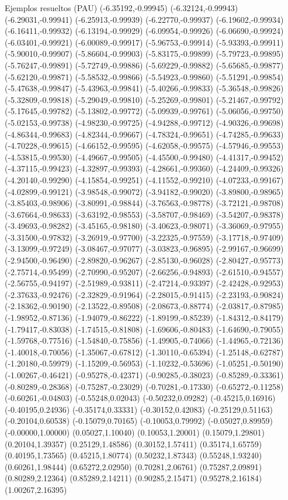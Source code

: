 \documentclass[11pt,a4paper]{article}
\begin{document}
\begin{fmex}{Ejemplos resueltos (PAU)}
(-6.35192,-0.99945) (-6.32124,-0.99943) (-6.29031,-0.99941) (-6.25913,-0.99939) (-6.22770,-0.99937) (-6.19602,-0.99934) (-6.16411,-0.99932) (-6.13194,-0.99929) (-6.09954,-0.99926) (-6.06690,-0.99924) (-6.03401,-0.99921) (-6.00089,-0.99917) (-5.96753,-0.99914) (-5.93393,-0.99911) (-5.90010,-0.99907) (-5.86604,-0.99903) (-5.83175,-0.99899) (-5.79723,-0.99895) (-5.76247,-0.99891) (-5.72749,-0.99886) (-5.69229,-0.99882) (-5.65685,-0.99877) (-5.62120,-0.99871) (-5.58532,-0.99866) (-5.54923,-0.99860) (-5.51291,-0.99854) (-5.47638,-0.99847) (-5.43963,-0.99841) (-5.40266,-0.99833) (-5.36548,-0.99826) (-5.32809,-0.99818) (-5.29049,-0.99810) (-5.25269,-0.99801) (-5.21467,-0.99792) (-5.17645,-0.99782) (-5.13802,-0.99772) (-5.09939,-0.99761) (-5.06056,-0.99750) (-5.02153,-0.99738) (-4.98230,-0.99725) (-4.94288,-0.99712) (-4.90326,-0.99698) (-4.86344,-0.99683) (-4.82344,-0.99667) (-4.78324,-0.99651) (-4.74285,-0.99633) (-4.70228,-0.99615) (-4.66152,-0.99595) (-4.62058,-0.99575) (-4.57946,-0.99553) (-4.53815,-0.99530) (-4.49667,-0.99505) (-4.45500,-0.99480) (-4.41317,-0.99452) (-4.37115,-0.99423) (-4.32897,-0.99393) (-4.28661,-0.99360) (-4.24409,-0.99326) (-4.20140,-0.99290) (-4.15854,-0.99251) (-4.11552,-0.99210) (-4.07233,-0.99167) (-4.02899,-0.99121) (-3.98548,-0.99072) (-3.94182,-0.99020) (-3.89800,-0.98965) (-3.85403,-0.98906) (-3.80991,-0.98844) (-3.76563,-0.98778) (-3.72121,-0.98708) (-3.67664,-0.98633) (-3.63192,-0.98553) (-3.58707,-0.98469) (-3.54207,-0.98378) (-3.49693,-0.98282) (-3.45165,-0.98180) (-3.40623,-0.98071) (-3.36069,-0.97955) (-3.31500,-0.97832) (-3.26919,-0.97700) (-3.22325,-0.97559) (-3.17718,-0.97409) (-3.13099,-0.97249) (-3.08467,-0.97077) (-3.03823,-0.96895) (-2.99167,-0.96699) (-2.94500,-0.96490) (-2.89820,-0.96267) (-2.85130,-0.96028) (-2.80427,-0.95773) (-2.75714,-0.95499) (-2.70990,-0.95207) (-2.66256,-0.94893) (-2.61510,-0.94557) (-2.56755,-0.94197) (-2.51989,-0.93811) (-2.47214,-0.93397) (-2.42428,-0.92953) (-2.37633,-0.92476) (-2.32829,-0.91964) (-2.28015,-0.91415) (-2.23193,-0.90824) (-2.18362,-0.90190) (-2.13522,-0.89508) (-2.08673,-0.88774) (-2.03817,-0.87985) (-1.98952,-0.87136) (-1.94079,-0.86222) (-1.89199,-0.85239) (-1.84312,-0.84179) (-1.79417,-0.83038) (-1.74515,-0.81808) (-1.69606,-0.80483) (-1.64690,-0.79055) (-1.59768,-0.77516) (-1.54840,-0.75856) (-1.49905,-0.74066) (-1.44965,-0.72136) (-1.40018,-0.70056) (-1.35067,-0.67812) (-1.30110,-0.65394) (-1.25148,-0.62787) (-1.20180,-0.59979) (-1.15209,-0.56953) (-1.10232,-0.53696) (-1.05251,-0.50190) (-1.00267,-0.46421) (-0.95278,-0.42371) (-0.90285,-0.38023) (-0.85289,-0.33361) (-0.80289,-0.28368) (-0.75287,-0.23029) (-0.70281,-0.17330) (-0.65272,-0.11258) (-0.60261,-0.04803) (-0.55248,0.02043) (-0.50232,0.09282) (-0.45215,0.16916) (-0.40195,0.24936) (-0.35174,0.33331) (-0.30152,0.42083) (-0.25129,0.51163) (-0.20104,0.60538) (-0.15079,0.70165) (-0.10053,0.79992) (-0.05027,0.89959) (-0.00000,1.00000) (0.05027,1.10040) (0.10053,1.20001) (0.15079,1.29801) (0.20104,1.39357) (0.25129,1.48586) (0.30152,1.57411) (0.35174,1.65759) (0.40195,1.73565) (0.45215,1.80774) (0.50232,1.87343) (0.55248,1.93240) (0.60261,1.98444) (0.65272,2.02950) (0.70281,2.06761) (0.75287,2.09891) (0.80289,2.12364) (0.85289,2.14211) (0.90285,2.15471) (0.95278,2.16184) (1.00267,2.16395) 
\end{fmex}
\end{document}
